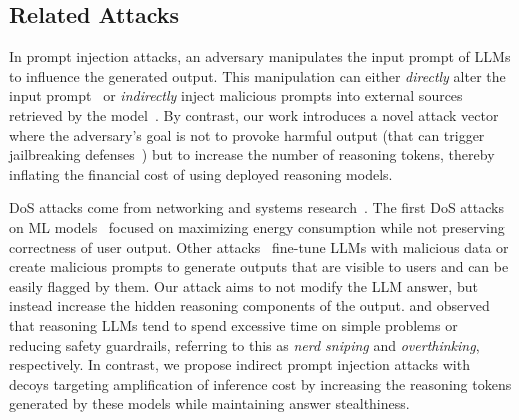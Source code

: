 \subsection{Related Attacks}

 In prompt injection attacks, an adversary manipulates the input prompt of LLMs to influence the generated output. This manipulation can either \emph{directly} alter the input prompt~\citep{perez2022ignore, apruzzese2023real} or \emph{indirectly} inject malicious prompts into external sources retrieved by the model~\citep{greshake2023not}. By contrast, our work introduces a novel attack vector where the adversary's goal is not to provoke harmful output (that can trigger jailbreaking defenses~\cite{anthropic2025, zaremba2025trading}) but to increase the number of reasoning tokens, thereby inflating the financial cost of using deployed reasoning models.



 DoS attacks come from networking and systems research~\citep{bellardo2003802, heftrig2024harder,martin2004denial}. The first DoS attacks on ML models~\citep{shumailov2021sponge} focused on maximizing energy consumption while not preserving correctness of user output. Other attacks~\citep{gao2024denial,chen2022nicgslowdown, gao2024inducing, geiping2024coercing} fine-tune LLMs with malicious data or create malicious prompts to generate outputs that are visible to users and can be easily flagged by them. Our attack aims to not modify the LLM answer,  but instead increase the hidden reasoning components of the output. \citet{zaremba2025trading} and \citet{chen2024not,wang2025underthinking} observed that reasoning LLMs tend to spend excessive time on simple problems or reducing safety guardrails, referring to this as \textit{nerd sniping} and \textit{overthinking}, respectively. In contrast, we propose indirect prompt injection attacks with decoys targeting amplification of inference cost by increasing the reasoning tokens generated by these models while maintaining answer stealthiness. 









